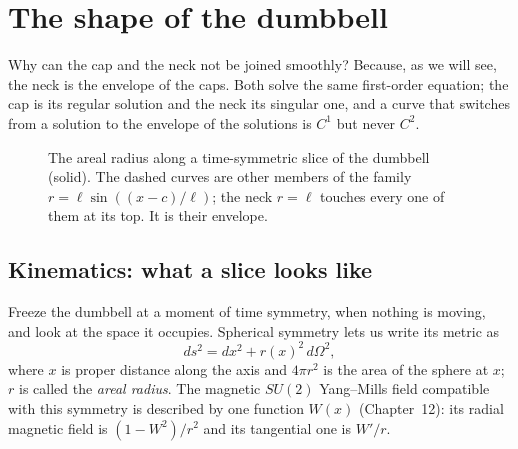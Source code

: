 \chapter{The shape of the dumbbell}\label{ch:shape}

\begin{questionbox}
Why can the cap and the neck not be joined smoothly? Because, as we will see, the neck is the envelope of the caps. Both solve the same first-order equation; the cap is its regular solution and the neck its singular one, and a curve that switches from a solution to the envelope of the solutions is $C^1$ but never $C^2$.
\end{questionbox}

\begin{figure}[h]
\centering
{}
\caption{The areal radius along a time-symmetric slice of the dumbbell (solid). The dashed curves are other members of the family $r=\ell\sin((x-c)/\ell)$; the neck $r=\ell$ touches every one of them at its top. It is their envelope.}
\label{fig:envelope}
\end{figure}

\section{Kinematics: what a slice looks like}

Freeze the dumbbell at a moment of time symmetry, when nothing is moving, and look at the space it occupies. Spherical symmetry lets us write its metric as
\begin{equation}\label{eq:slice}
ds^2 = dx^2 + r(x)^2\,d\Omega^2 ,
\end{equation}
where $x$ is proper distance along the axis and $4\pi r^2$ is the area of the sphere at $x$; $r$ is called the \emph{areal radius}.
The magnetic $SU(2)$ Yang--Mills field compatible with this symmetry is described by one function $W(x)$ (Chapter~12): its radial magnetic field is $(1-W^2)/r^2$ and its tangential one is $W'/r$.

